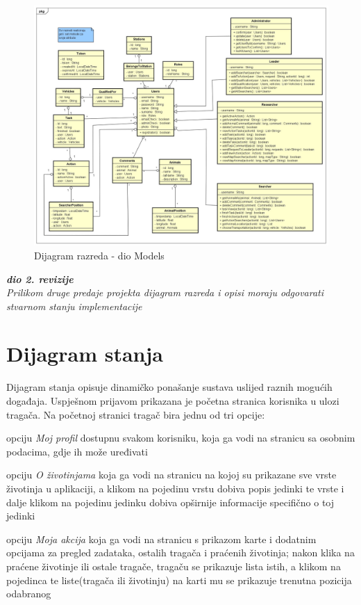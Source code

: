			\eject

			\begin{figure}[H]
				\includegraphics[scale=0.4]{slike/klasni_dijagram_models.jpg}
				\centering
				\caption{Dijagram razreda - dio Models}
				\label{fig:models}
			\end{figure}
			

			\textbf{\textit{dio 2. revizije}}\\			
			
			\textit{Prilikom druge predaje projekta dijagram razreda i opisi moraju odgovarati stvarnom stanju implementacije}
			
			
			
			\eject
		
		\section{Dijagram stanja}
			
			Dijagram stanja opisuje dinamičko ponašanje sustava uslijed raznih mogućih
		događaja. Uspješnom prijavom prikazana je početna stranica korisnika u ulozi tragača. 
		Na početnoj stranici tragač bira jednu od tri opcije:
		\begin{packed_item}
		\item opciju \textit{Moj profil} dostupnu svakom korisniku, koja ga vodi na stranicu sa osobnim podacima, gdje ih može uređivati
		\item opciju \textit{O životinjama} koja ga vodi na stranicu na kojoj su prikazane sve vrste životinja u aplikaciji, a klikom na pojedinu vrstu dobiva popis jedinki te vrste i dalje klikom na pojedinu jedinku dobiva opširnije informacije specifično o toj jedinki
		\item opciju \textit{Moja akcija} koja ga vodi na stranicu s prikazom karte i dodatnim opcijama za pregled zadataka, ostalih tragača i praćenih životinja; nakon klika na praćene životinje ili ostale tragače, tragaču se prikazuje lista istih, a klikom na pojedinca te liste(tragača ili životinju) na karti mu se prikazuje trenutna pozicija odabranog
		\end{packed_item}

